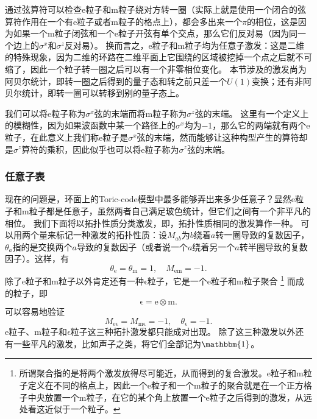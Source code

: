 通过弦算符可以检查e粒子和m粒子绕对方转一圈（实际上就是使用一个闭合的弦算符作用在一个有e粒子或者m粒子的格点上），都会多出来一个$\pi$的相位，这是因为如果一个m粒子闭弦和一个e粒子开弦有单个交点，那么它们反对易（因为同一个边上的${\sigma}^x$和${\sigma}^z$反对易）。
换而言之，e粒子和m粒子均为任意子激发：这是二维的特殊现象，因为二维的环路在二维平面上它围绕的区域被挖掉一个点之后就不可缩了，因此一个粒子转一圈之后可以有一个非零相位变化。
本节涉及的激发尚为阿贝尔统计，即转一圈之后得到的量子态和转之前只差一个$U(1)$变换；还有非阿贝尔统计，即转一圈可以转移到别的量子态上。

我们可以将e粒子称为$\sigma^x$弦的末端而将m粒子称为$\sigma^z$弦的末端。
这里有一个定义上的模糊性，因为如果波函数中某一个路径上的$\sigma^x$均为$-1$，那么它的两端就有两个e粒子，在此意义上我们称e粒子是$\sigma^x$弦的末端，然而能够让这种构型产生的算符却是$\sigma^z$算符的乘积，因此似乎也可以将e粒子称为$\sigma^z$弦的末端。

\subsubsection{任意子表}

现在的问题是，环面上的Toric-code模型中最多能够弄出来多少任意子？显然e粒子和m粒子都是任意子，虽然两者自己满足玻色统计，但它们之间有一个非平凡的相位。
我们下面将以拓扑性质分类激发，即，拓扑性质相同的激发算作一种。
可以用两个量来标记一种激发的拓扑性质：设$M_{ab}$为$b$绕着$a$转一圈导致的复数因子，$\theta_a$指的是交换两个$a$导致的复数因子（或者说一个$a$绕着另一个$a$转半圈导致的复数因子）。这样，有
\begin{equation}
    \theta_\mathrm{e} = \theta_\mathrm{m} = 1, \quad M_\mathrm{em} = - 1.
\end{equation}
除了e粒子和m粒子以外肯定还有一种$\mathrm{\epsilon}$粒子，它是一个e粒子和m粒子聚合%
\footnote{所谓聚合指的是将两个激发放得尽可能近，从而得到的复合激发。e粒子和m粒子定义在不同的格点上，因此一个e粒子和一个m粒子的聚合就是在一个正方格子中央放置一个m粒子，在它的某个角上放置一个e粒子之后得到的激发，从远处看这近似于一个粒子。}%
而成的粒子，即
\begin{equation}
    \mathrm{\epsilon} = \mathrm{e} \otimes \mathrm{m}.
\end{equation}
可以容易地验证
\begin{equation}
    M_\mathrm{e\epsilon} = M_\mathrm{m\epsilon} = -1, \quad \theta_\mathrm{\epsilon} = -1.
\end{equation}
e粒子、m粒子和$\mathrm{\epsilon}$粒子这三种拓扑激发都只能成对出现。
除了这三种激发以外还有一些平凡的激发，比如声子之类，将它们全部记为$\mathbbm{1}$。

